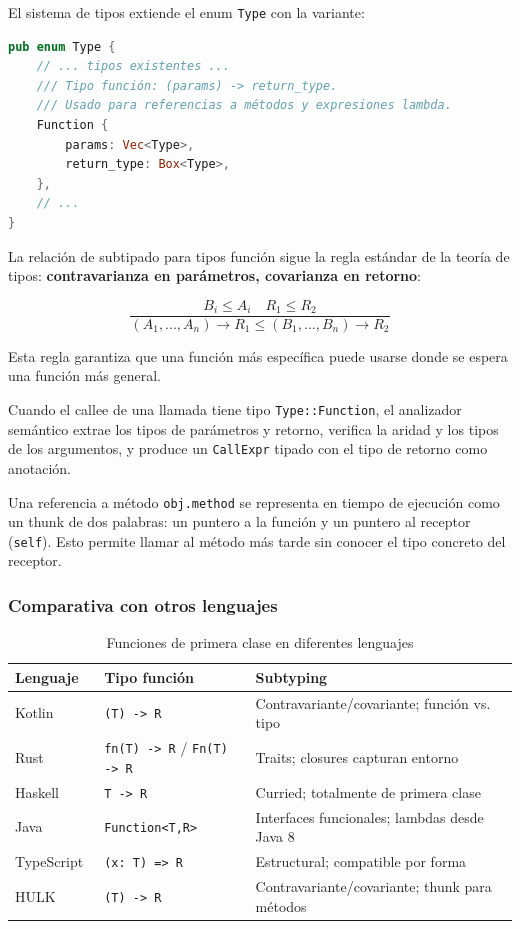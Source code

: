 \documentclass[12pt, a4paper]{article}
\begin{document}
El sistema de tipos extiende el enum \texttt{Type} con la variante:

\begin{lstlisting}[language=Rust, caption={Variante Type::Function en Rust},
                   label=lst:type-function]
pub enum Type {
    // ... tipos existentes ...
    /// Tipo función: (params) -> return_type.
    /// Usado para referencias a métodos y expresiones lambda.
    Function {
        params: Vec<Type>,
        return_type: Box<Type>,
    },
    // ...
}
\end{lstlisting}

La relación de subtipado para tipos función sigue la regla estándar de la
teoría de tipos: \textbf{contravarianza en parámetros, covarianza en retorno}:

\[
\frac{B_i \leq A_i \quad R_1 \leq R_2}
     {(A_1,...,A_n) \to R_1 \leq (B_1,...,B_n) \to R_2}
\]

Esta regla garantiza que una función más específica puede usarse donde se espera
una función más general.

Cuando el callee de una llamada tiene tipo \texttt{Type::Function}, el
analizador semántico extrae los tipos de parámetros y retorno, verifica la
aridad y los tipos de los argumentos, y produce un \texttt{CallExpr} tipado
con el tipo de retorno como anotación.

Una referencia a método \texttt{obj.method} se representa en tiempo de ejecución
como un thunk de dos palabras: un puntero a la función y un puntero al
receptor (\texttt{self}). Esto permite llamar al método más tarde sin conocer el
tipo concreto del receptor.

\subsubsection{Comparativa con otros lenguajes}

\begin{table}[h!]
\centering
\caption{Funciones de primera clase en diferentes lenguajes}
\label{tab:functype-compare}
\begin{tabularx}{\textwidth}{@{}lXX@{}}
\toprule
\textbf{Lenguaje} & \textbf{Tipo función} & \textbf{Subtyping} \\
\midrule
Kotlin~\cite{jemerov2017} & \texttt{(T) -> R} & Contravariante/covariante; función vs. tipo \\
Rust~\cite{klabnik2019} & \texttt{fn(T) -> R} / \texttt{Fn(T) -> R} & Traits; closures capturan entorno \\
Haskell~\cite{hudak2007} & \texttt{T -> R} & Curried; totalmente de primera clase \\
Java~\cite{gosling2021} & \texttt{Function<T,R>} & Interfaces funcionales; lambdas desde Java 8 \\
TypeScript~\cite{bierman2014} & \texttt{(x: T) => R} & Estructural; compatible por forma \\
HULK & \texttt{(T) -> R} & Contravariante/covariante; thunk para métodos \\
\bottomrule
\end{tabularx}
\end{table}
\end{document}
